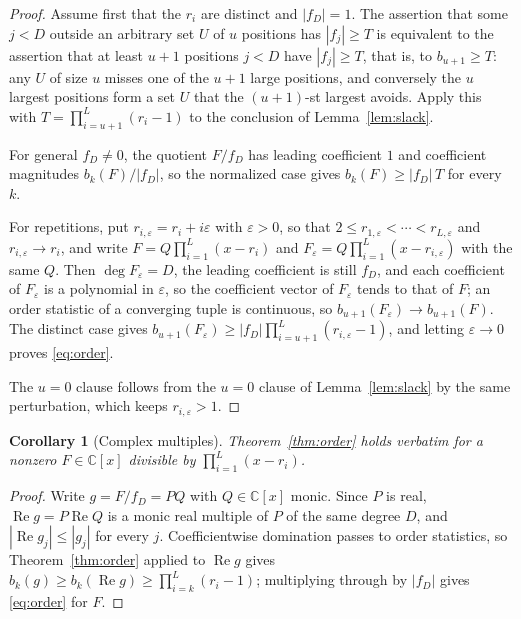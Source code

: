 \documentclass[11pt]{article}
\newtheorem{corollary}[theorem]{Corollary}
\begin{document}
\begin{proof}
Assume first that the $r_i$ are distinct and $|f_D|=1$.  The assertion that
some $j<D$ outside an arbitrary set $U$ of $u$ positions has $|f_j|\ge T$ is
equivalent to the assertion that at least $u+1$ positions $j<D$ have
$|f_j|\ge T$, that is, to $b_{u+1}\ge T$: any $U$ of size $u$ misses one of
the $u+1$ large positions, and conversely the $u$ largest positions form a set
$U$ that the $(u+1)$-st largest avoids.  Apply this with
$T=\prod_{i=u+1}^L(r_i-1)$ to the conclusion of Lemma~\ref{lem:slack}.

For general $f_D\ne0$, the quotient $F/f_D$ has leading coefficient $1$ and
coefficient magnitudes $b_k(F)/|f_D|$, so the normalized case gives
$b_k(F)\ge|f_D|\,T$ for every $k$.

For repetitions, put $r_{i,\varepsilon}=r_i+i\varepsilon$ with
$\varepsilon>0$, so that $2\le r_{1,\varepsilon}<\cdots<r_{L,\varepsilon}$ and
$r_{i,\varepsilon}\to r_i$, and write $F=Q\prod_{i=1}^L(x-r_i)$ and
$F_\varepsilon=Q\prod_{i=1}^L(x-r_{i,\varepsilon})$ with the same $Q$.  Then
$\deg F_\varepsilon=D$, the leading coefficient is still $f_D$, and each
coefficient of $F_\varepsilon$ is a polynomial in $\varepsilon$, so the
coefficient vector of $F_\varepsilon$ tends to that of $F$; an order statistic of a converging tuple is continuous, so
$b_{u+1}(F_\varepsilon)\to b_{u+1}(F)$.  The distinct case gives
$b_{u+1}(F_\varepsilon)\ge|f_D|\prod_{i=u+1}^L(r_{i,\varepsilon}-1)$, and letting
$\varepsilon\to0$ proves \eqref{eq:order}.

The $u=0$ clause follows from the $u=0$ clause of Lemma~\ref{lem:slack} by
the same perturbation, which keeps $r_{i,\varepsilon}>1$.
\end{proof}

\begin{corollary}[Complex multiples]\label{cor:complex}
Theorem~\ref{thm:order} holds verbatim for a nonzero $F\in\mathbb C[x]$
divisible by $\prod_{i=1}^L(x-r_i)$.
\end{corollary}

\begin{proof}
Write $g=F/f_D=PQ$ with $Q\in\mathbb C[x]$ monic.  Since $P$ is real,
$\operatorname{Re}g=P\operatorname{Re}Q$ is a monic real multiple of $P$ of
the same degree $D$, and $|\operatorname{Re}g_j|\le|g_j|$ for every $j$.
Coefficientwise domination passes to order statistics, so
Theorem~\ref{thm:order} applied to $\operatorname{Re}g$ gives
$b_k(g)\ge b_k(\operatorname{Re}g)\ge\prod_{i=k}^L(r_i-1)$; multiplying
through by $|f_D|$ gives \eqref{eq:order} for $F$.
\end{proof}
\end{document}
